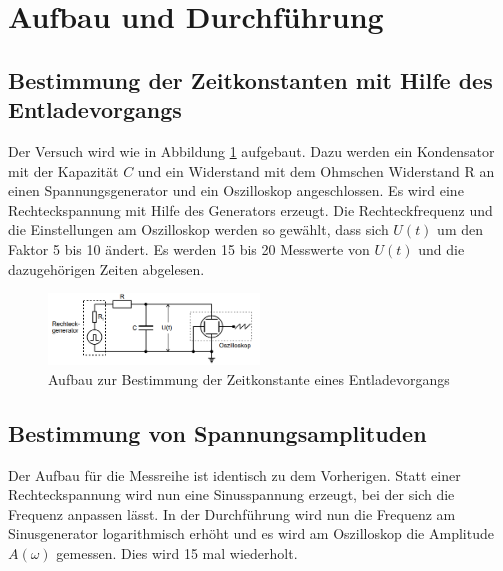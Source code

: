 \section{Aufbau und Durchführung}
\label{sec:Durchführung}
\subsection{Bestimmung der Zeitkonstanten mit Hilfe des Entladevorgangs}
Der Versuch wird wie in Abbildung \ref{fig:aufbauent} aufgebaut. Dazu werden ein Kondensator mit der Kapazität $C$ und ein Widerstand mit dem
Ohmschen Widerstand R an einen Spannungsgenerator und ein Oszilloskop angeschlossen. Es wird eine Rechteckspannung mit Hilfe des Generators erzeugt.
Die Rechteckfrequenz und die Einstellungen am Oszilloskop werden so gewählt, dass sich $U(t)$ um den Faktor 5 bis 10 ändert.
Es werden 15 bis 20 Messwerte von $U(t)$ und die dazugehörigen Zeiten abgelesen.
\begin{figure}
    \centering
    \caption{Aufbau zur Bestimmung der Zeitkonstante eines Entladevorgangs} 
    \label{fig:aufbauent}
    \includegraphics[width = 0.5\textwidth]{pics/aufbauent.png}
\end{figure}
\subsection{Bestimmung von Spannungsamplituden}
Der Aufbau für die Messreihe ist identisch zu dem Vorherigen. Statt einer Rechteckspannung wird nun eine Sinusspannung erzeugt, 
bei der sich die Frequenz anpassen lässt. In der Durchführung wird nun die Frequenz am Sinusgenerator logarithmisch erhöht und es wird am Oszilloskop die 
Amplitude $A(\omega)$ gemessen. Dies wird 15 mal wiederholt.
